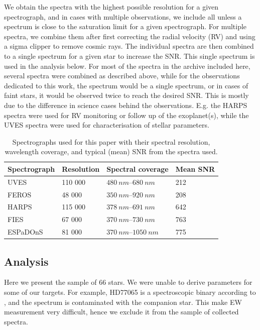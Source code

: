 \documentclass{aa}
\begin{document}
We obtain the spectra with the highest possible resolution for a given
spectrograph, and in cases with multiple observations, we include all unless a
spectrum is close to the saturation limit for a given spectrograph. For multiple
spectra, we combine them after first correcting the radial velocity (RV) and
using a sigma clipper to remove cosmic rays. The individual spectra are then
combined to a single spectrum for a given star to increase the SNR. This single
spectrum is used in the analysis below. For most of the spectra in the archive
included here, several spectra were combined as described above, while for the
observations dedicated to this work, the spectrum would be a single spectrum, or
in cases of faint stars, it would be observed twice to reach the desired SNR.
This is mostly due to the difference in science cases behind the observations.
E.g. the HARPS spectra were used for RV monitoring or follow up of the
exoplanet(s), while the UVES spectra were used for characterisation of stellar
parameters.

\begin{table}[htb!]
    \caption{Spectrographs used for this paper with their spectral resolution,
             wavelength coverage, and typical (mean) SNR from the spectra used.}
    \label{tab:instruments}
    \centering
    \begin{tabular}{llll}
      \hline\hline
      Spectrograph & Resolution & Spectral coverage           &   Mean SNR  \\
      \hline
      UVES         &    110 000 & $\SIrange{480}{680}{nm}$    &   212       \\
      FEROS        &     48 000 & $\SIrange{350}{920}{nm}$    &   208       \\
      HARPS        &    115 000 & $\SIrange{378}{691}{nm}$    &   642       \\
      FIES         &     67 000 & $\SIrange{370}{730}{nm}$    &   763       \\
      ESPaDOnS     &     81 000 & $\SIrange{370}{1050}{nm}$   &   775       \\
      \hline
    \end{tabular}
\end{table}



\subsection{Analysis}
\label{sec:results}
Here we present the sample of 66 stars. We were unable to derive parameters for
some of our targets. For example, HD77065 is a spectroscopic binary according to
\cite{Pourbaix2004}, and the spectrum is contaminated with the companion star.
This make EW measurement very difficult, hence we exclude it from the sample of
collected spectra.
\end{document}
